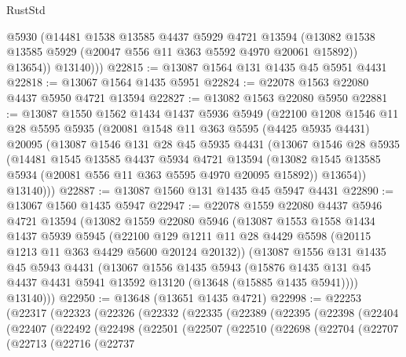 \begin{lexlean}{RustStd}
\begin{coremodule}
            @5930
            (@14481
              @1538
              @13585
              @4437
              @5929
              @4721
              @13594
              (@13082 @1538 @13585 @5929 (@20047 @556 @11 @363 @5592 @4970 @20061 @15892))
              @13654))
          @13140)))
@22815 := @13087 @1564 @131 @1435 @45 @5951 @4431
@22818 := @13067 @1564 @1435 @5951
@22824 := @22078 @1563 @22080 @4437 @5950 @4721 @13594
@22827 := @13082 @1563 @22080 @5950
@22881 := @13087
    @1550
    @1562
    @1434
    @1437
    @5936
    @5949
    (@22100
      @1208
      @1546
      @11
      @28
      @5595
      @5935
      (@20081
        @1548
        @11
        @363
        @5595
        (@4425 @5935 @4431)
        @20095
        (@13087
          @1546
          @131
          @28
          @45
          @5935
          @4431
          (@13067
            @1546
            @28
            @5935
            (@14481
              @1545
              @13585
              @4437
              @5934
              @4721
              @13594
              (@13082 @1545 @13585 @5934 (@20081 @556 @11 @363 @5595 @4970 @20095 @15892))
              @13654))
          @13140)))
@22887 := @13087 @1560 @131 @1435 @45 @5947 @4431
@22890 := @13067 @1560 @1435 @5947
@22947 := @22078
    @1559
    @22080
    @4437
    @5946
    @4721
    @13594
    (@13082
      @1559
      @22080
      @5946
      (@13087
        @1553
        @1558
        @1434
        @1437
        @5939
        @5945
        (@22100 @129 @1211 @11 @28 @4429 @5598 (@20115 @1213 @11 @363 @4429 @5600 @20124 @20132))
        (@13087
          @1556
          @131
          @1435
          @45
          @5943
          @4431
          (@13067
            @1556
            @1435
            @5943
            (@15876 @1435 @131 @45 @4437 @4431 @5941 @13592 @13120 (@13648 (@15885 @1435 @5941))))
          @13140)))
@22950 := @13648 (@13651 @1435 @4721)
@22998 := @22253
    (@22317
      (@22323
        (@22326
          (@22332
            (@22335
              (@22389
                (@22395
                  (@22398
                    (@22404
                      (@22407
                        (@22492
                          (@22498
                            (@22501
                              (@22507
                                (@22510
                                  (@22698
                                    (@22704
                                      (@22707
                                        (@22713
                                          (@22716
                                            (@22737

\end{coremodule}
\end{lexlean}

